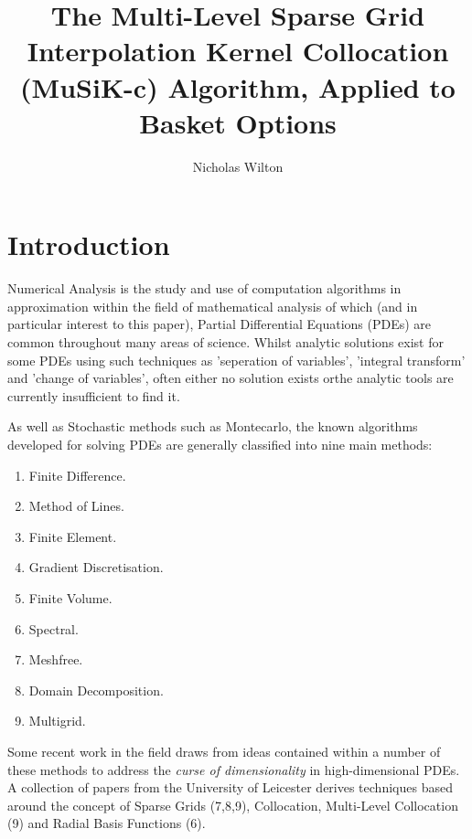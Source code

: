 \documentclass[a4paper]{amsart}
\begin{document}
\title[Multi-Level Sparse Grid Interpolation Kernel Collocation (MuSiKc)]
{The Multi-Level Sparse Grid Interpolation Kernel Collocation (MuSiK-c) Algorithm, Applied to Basket Options}
\author[Nicholas Wilton]{Nicholas Wilton}


\maketitle

\section{Introduction}

Numerical Analysis is the study and use of computation algorithms in approximation within the field of mathematical analysis of which (and in particular interest to this paper), Partial Differential Equations (PDEs) are common throughout many areas of science. Whilst analytic solutions exist for some PDEs using such techniques as 'seperation of variables', 'integral transform' and 'change of variables', often either no solution exists orthe analytic tools are currently insufficient to find it.   

As well as Stochastic methods such as Montecarlo, the known algorithms developed for solving PDEs are generally classified into nine main methods:\\
\renewcommand{\labelenumi}{\arabic{enumi}}
\begin{enumerate}
\item  Finite Difference.
\item  Method of Lines.
\item  Finite Element.
\item  Gradient Discretisation.
\item  Finite Volume.
\item  Spectral.
\item  Meshfree.
\item  Domain Decomposition.
\item  Multigrid.
\end{enumerate}

Some recent work in the field draws from ideas contained within a number of these methods to address the \emph{curse of dimensionality} in high-dimensional PDEs. A collection of papers from the University of Leicester\cite{mski0} \cite{mski1} \cite{mski2} derives techniques based around the concept of Sparse Grids (7,8,9), Collocation, Multi-Level Collocation (9) and Radial Basis Functions (6).
\end{document}
